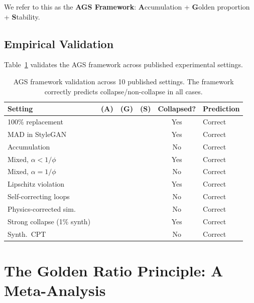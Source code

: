 \documentclass[11pt]{article}
\newcommand{\cmark}{\ding{51}}%
\newcommand{\xmark}{\ding{55}}%
\newcommand{\varph}{\phi}
\begin{document}
We refer to this as the \textbf{AGS Framework}: \textbf{A}ccumulation + \textbf{G}olden proportion + \textbf{S}tability.

\subsection{Empirical Validation}

Table~\ref{tab:ags_validation} validates the AGS framework across published experimental settings.

\begin{table}[t]
\centering
\small
\begin{tabular}{@{}lccccp{2.2cm}@{}}
\toprule
\textbf{Setting} & \textbf{(A)} & \textbf{(G)} & \textbf{(S)} & \textbf{Collapsed?} & \textbf{Prediction} \\
\midrule
100\% replacement~\citep{shumailov2023curse} & \xmark & \xmark & \cmark & Yes & Correct \\
MAD in StyleGAN~\citep{alemohammad2024self} & \xmark & \xmark & \xmark & Yes & Correct \\
Accumulation~\citep{gerstgrasser2024model} & \cmark & \cmark & \cmark & No & Correct \\
Mixed, $\alpha < 1/\varph$~\citep{dohmatob2024strong} & \cmark & \xmark & \cmark & Yes & Correct \\
Mixed, $\alpha = 1/\varph$~\citep{golden2025} & \cmark & \cmark & \cmark & No & Correct \\
Lipschitz violation~\citep{neural2026resonance} & \cmark & \cmark & \xmark & Yes & Correct \\
Self-correcting loops~\citep{selfcorrecting2024} & \cmark & \cmark & \cmark & No & Correct \\
Physics-corrected sim.~\citep{selfcorrecting2024} & \cmark & \cmark & \cmark & No & Correct \\
Strong collapse (1\% synth)~\citep{dohmatob2024strong} & \cmark & \xmark & \cmark & Yes & Correct \\
Synth.\ CPT~\citep{synthcpt2024} & \cmark & \cmark & \cmark & No & Correct \\
\bottomrule
\end{tabular}
\caption{AGS framework validation across 10 published settings. The framework correctly predicts collapse/non-collapse in all cases.}
\label{tab:ags_validation}
\end{table}

\section{The Golden Ratio Principle: A Meta-Analysis}
\label{sec:meta}
\end{document}
